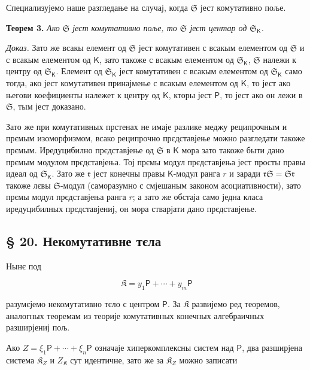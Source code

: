 \documentclass[11pt]{article}
\begin{document}
Специализујемо наше разгледање на случај, когда \(\mathfrak S\) јест комутативно поље.

\textbf{Теорем 3.} \emph{Ако \(\mathfrak S\) јест комутативно поље, то \(\mathfrak S\) јест центар од \(\mathfrak S_{\mathsf K}\).}

\emph{Доказ.} Зато же всакы елемент од \(\mathfrak S\) јест комутативен с всакым елементом од \(\mathfrak S\) и с всакым елементом од \(\mathsf K\), зато такоже с всакым елементом од \(\mathfrak S_{\mathsf K}\), \(\mathfrak S\) належи к центру од \(\mathfrak S_{\mathsf K}\). Елемент од \(\mathfrak S_{\mathsf K}\) јест комутативен с всакым елементом од \(\mathfrak S_{\mathsf K}\) само тогда, ако јест комутативен принајмење с всакым елементом од \(\mathsf K\), то јест ако његови коефициенты належет к центру од \(\mathsf K\), кторы јест \(\mathsf P\), то јест ако он лежи в \(\mathfrak S\), тым јест доказано.

Зато же при комутативных прстенах не имаје разлике меджу реципрочным и прємым изоморфизмом, всако реципрочно прєдставјење можно разгледати такоже прємым. Иредуцибилно прєдставјење од \(\mathfrak S\) в \(\mathsf K\) мора зато такоже быти дано прємым модулом прєдставјења. Тој прємы модул прєдставјења јест просты правы идеал од \(\mathfrak S_{\mathsf K}\). Зато же \(\mathfrak r\) јест конечны правы \(\mathsf K\)-модул ранга \(r\) и заради \(\mathfrak r\mathfrak S=\mathfrak S\mathfrak r\) такоже лєвы \(\mathfrak S\)-модул (саморазумно с смјешаным законом асоциативности), зато прємы модул прєдставјења ранга \(r\); а зато же обстаја само једна класа иредуцибилных прєдставјениј, он мора стварјати дано прєдставјење.

\subsection*{§ 20. Некомутативне тєла}\label{nichtkommutative-koerper}

Нынє под

\[
\mathfrak K=y_1\mathsf P+\cdots+y_m\mathsf P
\]

разумєјемо некомутативно тєло с центром \(\mathsf P\). За \(\mathfrak K\) развијемо ред теоремов, аналогных теоремам из теорије комутативных конечных алгебраичных разширјениј пољ.

Ако \(Z=\xi_1\mathsf P+\cdots+\xi_n\mathsf P\) означаје хиперкомплексны систем над \(\mathsf P\), два разширјена система \(\mathfrak K_Z\) и \(Z_{\mathfrak K}\) сут идентичне, зато же за \(\mathfrak K_Z\) можно записати
\end{document}
